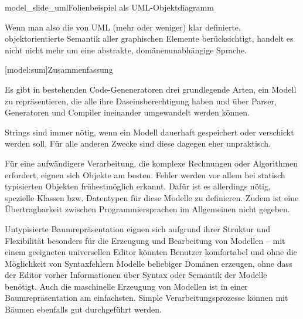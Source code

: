 \documentclass[11pt, a4paper, bibgerm]{scrbook}
\newcommand\lsection{}
\newcommand\fig{}
\begin{document}
\fig{model_slide_uml}{Folienbeispiel als UML-Objektdiagramm}

Wenn man also die von UML (mehr oder weniger) klar definierte,
objektorientierte Semantik aller graphischen Elemente berücksichtigt,
handelt es nicht nicht mehr um eine abstrakte, domänenunabhängige
Sprache.

\lsection[model:sum]{Zusammenfassung}

Es gibt in bestehenden Code-Geneneratoren drei grundlegende Arten, ein
Modell zu repräsentieren, die alle ihre Daseinsberechtigung haben und
über Parser, Generatoren und Compiler ineinander umgewandelt werden
können.

Strings sind immer nötig, wenn ein Modell dauerhaft gespeichert oder
verschickt werden soll. Für alle anderen Zwecke sind diese dagegen eher
unpraktisch.

Für eine aufwändigere Verarbeitung, die komplexe Rechnungen oder
Algorithmen erfordert, eignen sich Objekte am besten. Fehler werden vor
allem bei statisch typisierten Objekten frühestmöglich erkannt. Dafür
ist es allerdings nötig, spezielle Klassen bzw. Datentypen für diese
Modelle zu definieren. Zudem ist eine Übertragbarkeit zwischen
Programmiersprachen im Allgemeinen nicht gegeben.

Untypisierte Baumrepräsentation eignen sich aufgrund ihrer Struktur und
Flexibilität besonders für die Erzeugung und Bearbeitung von Modellen --
mit einem geeigneten universellen Editor könnten Benutzer komfortabel
und ohne die Möglichkeit von Syntaxfehlern Modelle beliebiger Domänen
erzeugen, ohne dass der Editor vorher Informationen über Syntax oder
Semantik der Modelle benötigt. Auch die maschinelle Erzeugung von
Modellen ist in einer Baumrepräsentation am einfachsten. Simple
Verarbeitungsprozesse können mit Bäumen ebenfalls gut durchgeführt
werden.
\end{document}
